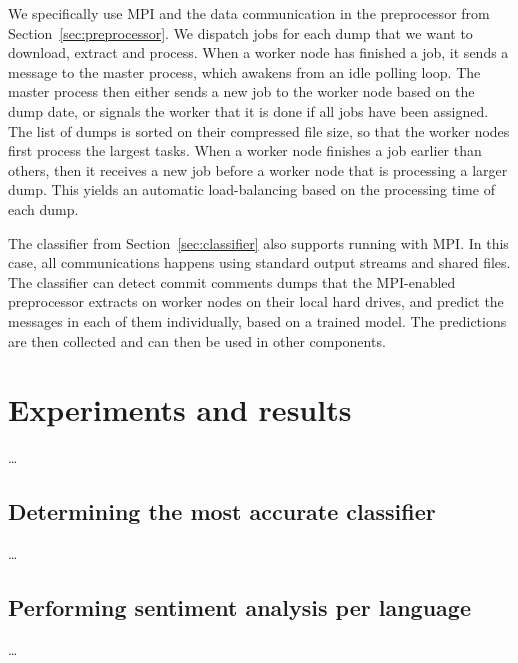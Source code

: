 \documentclass{article}
\begin{document}
We specifically use MPI and the data communication in the preprocessor from 
Section~\ref{sec:preprocessor}. We dispatch jobs for each dump that we want to 
download, extract and process. When a worker node has finished a job, it sends 
a message to the master process, which awakens from an idle polling loop. The 
master process then either sends a new job to the worker node based on the dump 
date, or signals the worker that it is done if all jobs have been assigned. The 
list of dumps is sorted on their compressed file size, so that the worker nodes 
first process the largest tasks. When a worker node finishes a job earlier than 
others, then it receives a new job before a worker node that is processing a
larger dump. This yields an automatic load-balancing based on the processing
time of each dump.

The classifier from Section~\ref{sec:classifier} also supports running with 
MPI\@. In this case, all communications happens using standard output streams
and shared files. The classifier can detect commit comments dumps that the 
MPI-enabled preprocessor extracts on worker nodes on their local hard drives, 
and predict the messages in each of them individually, based on a trained 
model. The predictions are then collected and can then be used in other 
components.

\section{Experiments and results}\label{sec:experiments-and-results}
\ldots

\subsection{Determining the most accurate classifier}\label{sec:most-accurate-classifier}
\ldots

\subsection{Performing sentiment analysis per language}\label{sec:sentiment-analysis-per-language}
\ldots
\end{document}
